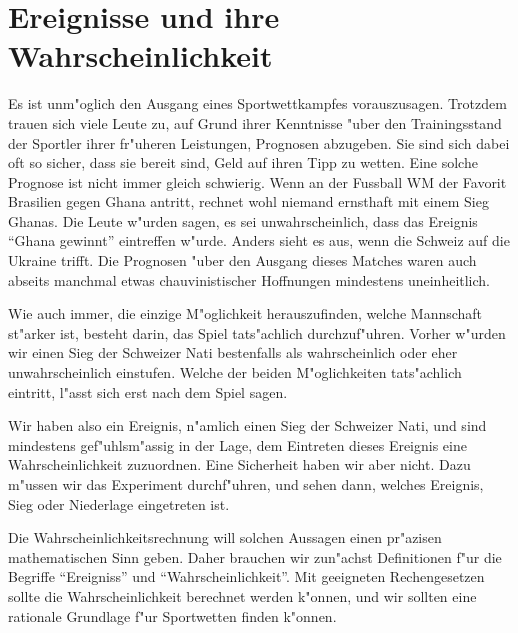 %
%
%
\chapter{Ereignisse und ihre Wahrscheinlichkeit\label{chapter-ereignisse-und-wahrscheinlichkeit}}
Es ist unm"oglich den Ausgang eines Sportwettkampfes vorauszusagen.
Trotzdem trauen sich viele Leute zu, auf Grund ihrer Kenntnisse "uber den
Trainingsstand der Sportler ihrer fr"uheren Leistungen, Prognosen abzugeben.
Sie sind sich dabei oft so sicher, dass sie bereit sind, Geld auf ihren Tipp
zu wetten.
Eine solche Prognose ist nicht immer gleich schwierig. Wenn an der
Fussball WM der Favorit Brasilien gegen Ghana antritt,
rechnet wohl niemand ernsthaft mit einem Sieg Ghanas. Die Leute w"urden
sagen, es sei unwahrscheinlich, dass das Ereignis ``Ghana gewinnt'' eintreffen
w"urde. Anders sieht es aus, wenn die Schweiz auf die Ukraine trifft.
Die Prognosen "uber den Ausgang dieses Matches waren auch abseits
manchmal etwas chauvinistischer Hoffnungen mindestens uneinheitlich.

Wie auch immer, die einzige M"oglichkeit herauszufinden, welche Mannschaft
st"arker ist, besteht darin, das Spiel tats"achlich durchzuf"uhren.
Vorher w"urden wir einen Sieg der Schweizer Nati bestenfalls als
wahrscheinlich oder eher unwahrscheinlich einstufen.
Welche der beiden M"oglichkeiten tats"achlich eintritt, l"asst sich
erst nach dem Spiel sagen.

Wir haben also ein Ereignis, n"amlich einen Sieg der Schweizer Nati,
und sind mindestens gef"uhlsm"assig in der Lage, dem Eintreten dieses
Ereignis eine Wahrscheinlichkeit zuzuordnen.
Eine Sicherheit haben wir aber nicht. 
Dazu m"ussen wir das Experiment durchf"uhren, und sehen dann,
welches Ereignis, Sieg oder Niederlage eingetreten ist.

Die Wahrscheinlichkeitsrechnung will solchen Aussagen einen pr"azisen
mathematischen Sinn geben. Daher brauchen wir zun"achst Definitionen
f"ur die Begriffe ``Ereigniss'' und ``Wahrscheinlichkeit''.  Mit geeigneten
Rechengesetzen sollte die Wahrscheinlichkeit berechnet werden k"onnen,
und wir sollten eine rationale Grundlage f"ur Sportwetten finden k"onnen.


